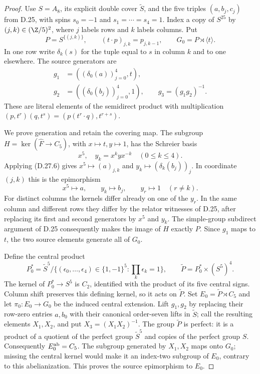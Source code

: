 \begin{proof}
Use $S=A_8$, its explicit double cover $\widetilde S$, and
the five triples $(a,b_j,c_j)$ from D.25, with spins
$s_0=-1$ and $s_1=\cdots=s_4=1$.  Index a copy of $S^{25}$
by $(j,k)\in(\Z/5)^2$, where $j$ labels rows and $k$
labels columns.  Put
\[
 P=S^{\{(j,k)\}},\qquad
 (t\cdot p)_{j,k}=p_{j,k-1},\qquad
 G_0=P\rtimes\langle t\rangle.
 \tag{D.27.5}
\]
In one row write $\delta_k(s)$ for the tuple equal to $s$
in column $k$ and to one elsewhere.  The source generators are
\[
 \begin{split}
 g_1&=((\delta_0(a))_{j=0}^4,t),\\
 g_2&=((\delta_0(b_j))_{j=0}^4,1),\qquad
 g_3=(g_1g_2)^{-1}.
 \end{split}
 \tag{D.27.6}
\]
These are literal elements of the semidirect product with
multiplication $(p,t^r)(q,t^s)=(p(t^r\cdot q),t^{r+s})$.

We prove generation and retain the covering map.  The subgroup
$H=\ker(\widehat F\to C_5)$, with $x\mapsto t,y\mapsto1$,
has the Schreier basis
\[
 x^5,\quad y_k=x^kyx^{-k}\quad(0\leq k\leq4).
 \tag{D.27.7}
\]
Applying \textup{(D.27.6)} gives $x^5\mapsto(a)_{j,k}$ and
$y_k\mapsto(\delta_k(b_j))_j$.  In coordinate $(j,k)$ this
is the epimorphism
\[
 x^5\longmapsto a,\qquad
 y_k\longmapsto b_j,\qquad
 y_r\longmapsto1\quad(r\ne k).
 \tag{D.27.8}
\]
For distinct columns the kernels differ already on one of the
$y_r$.  In the same column and different rows they differ by
the relator witnesses of D.25, after replacing its first and
second generators by $x^5$ and $y_k$.  The simple-group
subdirect argument of D.25 consequently makes the image of
$H$ exactly $P$.  Since $g_1$ maps to $t$, the two source
elements generate all of $G_0$.

Define the central product
\[
 P_0^*=\widetilde S^5/
 \{(\epsilon_0,\ldots,\epsilon_4)\in\{1,-1\}^5:
                        \prod_k\epsilon_k=1\},
 \qquad
 \widetilde P=P_0^*\times(S^5)^4.
 \tag{D.27.9}
\]
The kernel of $P_0^*\to S^5$ is $C_2$, identified with the
product of its five central signs.  Column shift preserves
this defining kernel, so it acts on $\widetilde P$.
Set $E_0=\widetilde P\rtimes C_5$ and let
$\pi_0:E_0\to G_0$ be the induced central extension.
Lift $g_1,g_2$ by replacing their row-zero entries $a,b_0$
with their canonical order-seven lifts in $\widetilde S$;
call the resulting elements $X_1,X_2$, and put
$X_3=(X_1X_2)^{-1}$.
The group $\widetilde P$ is perfect: it is a product of a
quotient of the perfect group $\widetilde S^5$ and copies
of the perfect group $S$.  Consequently $E_0^{\rm ab}=C_5$.
The subgroup generated by $X_1,X_2$ maps onto $G_0$; missing
the central kernel would make it an index-two subgroup of
$E_0$, contrary to this abelianization.  This proves the
source epimorphism to $E_0$.


\end{proof}
